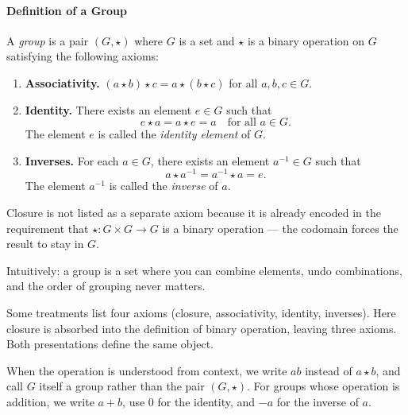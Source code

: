 \paragraph{Definition of a Group}

\begin{definition}[Group]
\label{def:notes-groups-definition-l6}
A \emph{group} is a pair $(G, \star)$ where $G$ is a set and
$\star$ is a binary operation on $G$ satisfying the following axioms:

\begin{enumerate}[label=\textbf{G\arabic*.}]
  \item \textbf{Associativity.}
        $(a \star b) \star c = a \star (b \star c)$
        for all $a, b, c \in G$.

  \item \textbf{Identity.}
        There exists an element $e \in G$ such that
        \[
          e \star a = a \star e = a
          \quad \text{for all } a \in G.
        \]
        The element $e$ is called the \emph{identity element} of $G$.

  \item \textbf{Inverses.}
        For each $a \in G$, there exists an element $a^{-1} \in G$ such that
        \[
          a \star a^{-1} = a^{-1} \star a = e.
        \]
        The element $a^{-1}$ is called the \emph{inverse} of $a$.
\end{enumerate}
\end{definition}

\begin{remark}
Closure is not listed as a separate axiom because it is already
encoded in the requirement that $\star : G \times G \to G$ is a
binary operation --- the codomain forces the result to stay in $G$.

Intuitively: a group is a set where you can combine elements,
undo combinations, and the order of grouping never matters.
\end{remark}

\begin{remark}
Some treatments list four axioms (closure, associativity, identity, inverses).
Here closure is absorbed into the definition of binary operation,
leaving three axioms. Both presentations define the same object.
\end{remark}

\begin{remark}[Notation]
When the operation is understood from context, we write $ab$ instead
of $a \star b$, and call $G$ itself a group rather than the pair $(G, \star)$.
For groups whose operation is addition, we write $a + b$, use $0$ for the
identity, and $-a$ for the inverse of $a$.
\end{remark}

